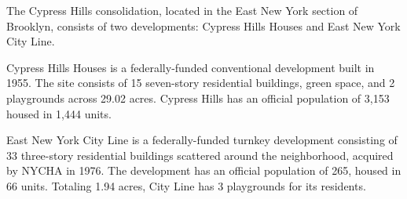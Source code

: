 The Cypress Hills consolidation, located in the East New York section of Brooklyn, consists of two developments: Cypress Hills Houses and East New York City Line. \par \vspace{.7\baselineskip}Cypress Hills Houses is a federally-funded conventional development built in 1955. The site consists of 15 seven-story residential buildings, green space, and 2 playgrounds across 29.02 acres. Cypress Hills has an official population of 3,153 housed in 1,444 units. \par \vspace{.7\baselineskip}East New York City Line is a federally-funded turnkey development consisting of 33 three-story residential buildings scattered around the neighborhood, acquired by NYCHA in 1976. The development has an official population of 265, housed in 66 units. Totaling 1.94 acres, City Line has 3 playgrounds for its residents.